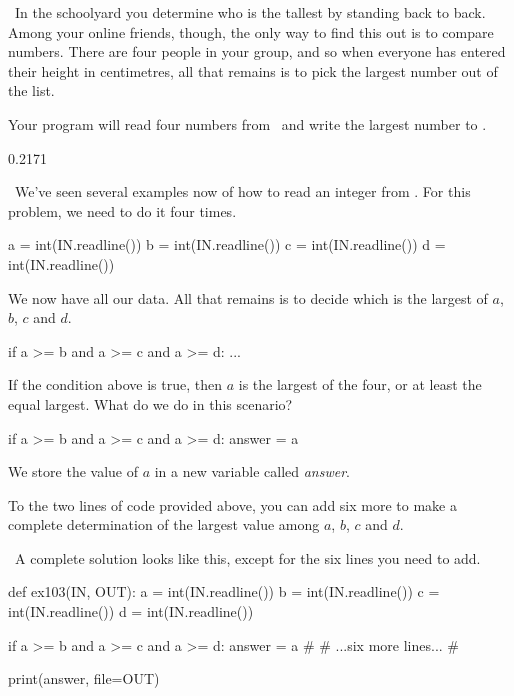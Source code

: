 
\Question\ In the schoolyard you determine who is the tallest by standing back to back.
Among your online friends, though, the only way to find this out is to compare numbers.
There are four people in your group, and so when everyone has entered their height in
centimetres, all that remains is to pick the largest number out of the list.

Your program will read four numbers from \IN\ and write the largest number to \OUT.

\Sample

       {0.2}{171}

\Scratch\ We've seen several examples now of how to read an integer from \IN. For this
problem, we need to do it four times.

\begin{pythoncode}
    a = int(IN.readline())
    b = int(IN.readline())
    c = int(IN.readline())
    d = int(IN.readline())
\end{pythoncode}

We now have all our data. All that remains is to decide which is the largest of $a$, $b$,
$c$ and $d$.

\begin{pythoncode}
    if a >= b and a >= c and a >= d:
        ...
\end{pythoncode}

If the condition above is true, then $a$ is the largest of the four, or at least the equal
largest. What do we do in this scenario?

\begin{pythoncode}
    if a >= b and a >= c and a >= d:
        answer = a
\end{pythoncode}

We store the value of $a$ in a new variable called \emph{answer}.

To the two lines of code provided above, you can add six more to make a complete
determination of the largest value among $a$, $b$, $c$ and $d$.

\Solution\ A complete solution looks like this, except for the six lines you need to add.

\begin{pythoncode}
    def ex103(IN, OUT):
        a = int(IN.readline())
        b = int(IN.readline())
        c = int(IN.readline())
        d = int(IN.readline())

        if a >= b and a >= c and a >= d:
            answer = a
        #
        # ...six more lines...
        #

        print(answer, file=OUT)
\end{pythoncode}

